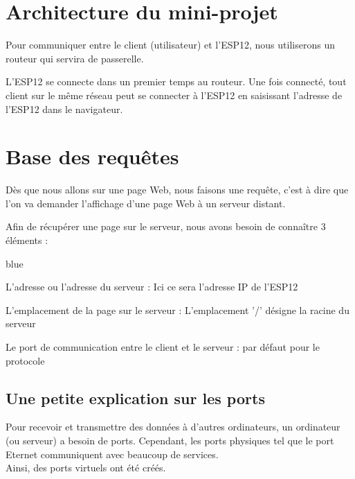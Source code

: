 \section{Architecture du mini-projet}

Pour communiquer entre le client (utilisateur) et l'ESP12, nous utiliserons un routeur qui servira de passerelle.


L'ESP12 se connecte dans un premier temps au routeur. 
Une fois connecté, tout client sur le même réseau peut se connecter à l'ESP12 en saisissant l'adresse de 
l'ESP12 dans le navigateur.

\section{Base des requêtes}

Dès que nous allons sur une page Web, nous faisons une requête, c'est à dire que l'on va demander l'affichage 
d'une page Web à un serveur distant.


Afin de récupérer une page sur le serveur, nous avons besoin de connaître 3 éléments :

\begin{items}{blue}{\Triangle}
    \item L'adresse  ou l'adresse du serveur : Ici ce sera l'adresse IP de l'ESP12
    \item L'emplacement de la page sur le serveur : L'emplacement '/' désigne la racine du serveur
    \item Le port de communication entre le client et le serveur :  par défaut pour 
    le protocole  
\end{items}


\subsection{Une petite explication sur les ports}

Pour recevoir et transmettre des données à d’autres ordinateurs, un ordinateur (ou serveur) a
besoin de ports. Cependant, les ports physiques tel que le port Eternet communiquent avec beaucoup de services.\\

Ainsi, des ports virtuels ont été créés. \\


